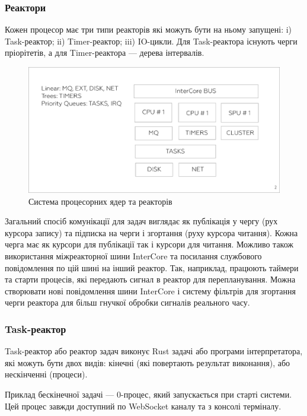 \subsubsection{Реактори}
Кожен процесор має три типи реакторів які можуть бути на ньому запущені:
i) Task-реактор; ii) Timer-реактор; iii) IO-цикли. Для Task-реактора
існують черги пріорітетів, а для Timer-реактора --- дерева інтервалів.
\begin{figure}[h]
  \centerline{\includegraphics[scale=0.25]{sys.eps}}
  \caption{Система процесорних ядер та реакторів}
\end{figure}
Загальний спосіб комунікації для задач виглядає як публікація
у чергу (рух курсора запису) та підписка на черги і
згортання (руху курсора читання). Кожна черга має як
курсори для публікації так і курсори для читання. Можливо також
використання міжреакторної шини InterCore та посилання
службового повідомлення по цій шині на інший реактор. Так,
наприклад, працюють таймери та старти процесів, які передають
сигнал в реактор для перепланування. Можна створювати нові повідомлення
шини InterCore і систему фільтрів для згортання черги
реактора для більш гнучкої обробки сигналів реального часу.

\subsubsection*{Task-реактор}
Task-реактор або реактор задач виконує Rust задачі або
програми інтерпретатора, які можуть бути двох видів:
кінечні (які повертають результат виконання),
або нескінченні (процеси).

Приклад бескінечної задачі --- 0-процес,
який запускається при старті системи. Цей процес завжди доступний
по WebSocket каналу та з консолі терміналу.

